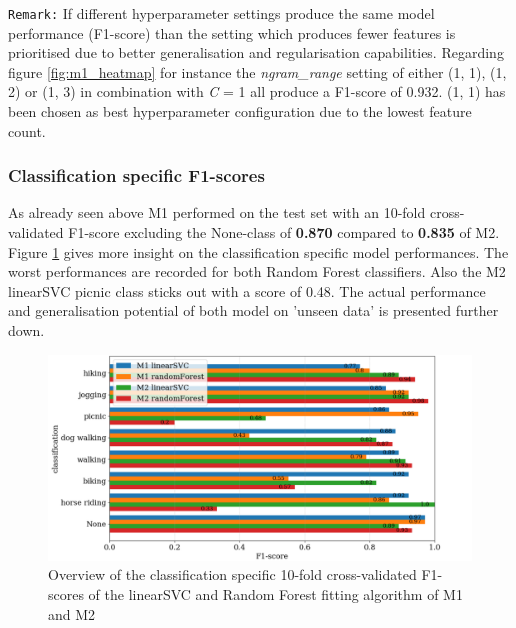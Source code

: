 \texttt{Remark:} If different hyperparameter settings produce the same model performance (F1-score) than the setting which produces fewer features is prioritised due to better generalisation and regularisation capabilities. Regarding figure \ref{fig:m1_heatmap} for instance the \textit{ngram\_range} setting of either (1, 1), (1, 2) or (1, 3) in combination with \textit{C} = 1 all produce a F1-score of 0.932. (1, 1) has been chosen as best hyperparameter configuration due to the lowest feature count.

\subsubsection{Classification specific F1-scores}
As already seen above M1 performed on the test set with an 10-fold cross-validated F1-score excluding the None-class of \textbf{0.870} compared to \textbf{0.835} of M2. Figure \ref{fig:m1_m2_class_f1_scores} gives more insight on the classification specific model performances. The worst performances are recorded for both Random Forest classifiers. Also the M2 linearSVC picnic class sticks out with a score of 0.48. The actual performance and generalisation potential of both model on 'unseen data' is presented further down.
\begin{figure}[h!]
   \centering
   \includegraphics[width=\textwidth]{img/m1_m2_class_f1_scores_bigger_font.pdf}
   \caption{Overview of the classification specific 10-fold cross-validated F1-scores of the linearSVC and Random Forest fitting algorithm of M1 and M2}
   \label{fig:m1_m2_class_f1_scores}
\end{figure}

